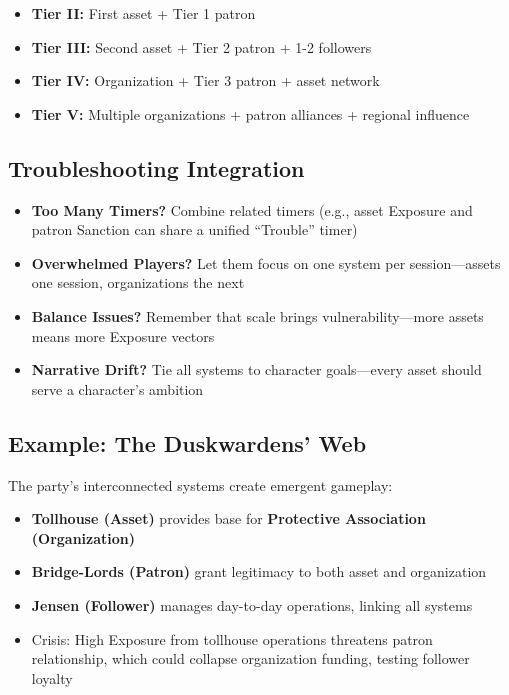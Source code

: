 \documentclass[10pt]{article}
\begin{document}
    \begin{itemize}
    \item \textbf{Tier II:} First asset + Tier 1 patron
    \item \textbf{Tier III:} Second asset + Tier 2 patron + 1-2 followers
    \item \textbf{Tier IV:} Organization + Tier 3 patron + asset network
    \item \textbf{Tier V:} Multiple organizations + patron alliances + regional influence
    \end{itemize}
    
    \subsection{Troubleshooting Integration}
    \begin{itemize}
    \item \textbf{Too Many Timers?} Combine related timers (e.g., asset Exposure and patron Sanction can share a unified ``Trouble'' timer)
    \item \textbf{Overwhelmed Players?} Let them focus on one system per session---assets one session, organizations the next
    \item \textbf{Balance Issues?} Remember that scale brings vulnerability---more assets means more Exposure vectors
    \item \textbf{Narrative Drift?} Tie all systems to character goals---every asset should serve a character's ambition
    \end{itemize}
    
    \subsection{Example: The Duskwardens' Web}
    The party's interconnected systems create emergent gameplay:
    
    \begin{itemize}
    \item \textbf{Tollhouse (Asset)} provides base for \textbf{Protective Association (Organization)}
    \item \textbf{Bridge-Lords (Patron)} grant legitimacy to both asset and organization
    \item \textbf{Jensen (Follower)} manages day-to-day operations, linking all systems
    \item Crisis: High Exposure from tollhouse operations threatens patron relationship, which could collapse organization funding, testing follower loyalty
    \end{itemize}
    
\end{document}
